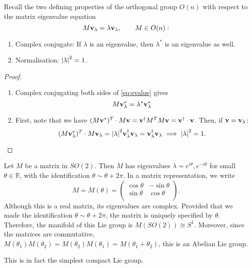 
Recall the two defining properties of the orthogonal group $O(n)$ with respect to the matrix eigenvalue equation
\begin{equation} \label{eq:evalue}
  M \vb{v}_\lambda = \lambda \vb{v}_\lambda, \qquad M \in O(n):
\end{equation}
\begin{enumerate}
  \item Complex conjugate: If $\lambda$ is an eigenvalue, then $\lambda^*$ is an eigenvalue as well.
  \item Normalisation: $\abs{\lambda}^2 = 1$.
\end{enumerate}
\begin{proof}
  \begin{enumerate}
    \item Complex conjugating both sides of \eqref{eq:evalue} gives
      \begin{equation}
        M \vb{v}_\lambda^* = \lambda^* \vb{v}_\lambda^*
      \end{equation}
    \item First, note that we have \((M \vb{v}^*)^T \cdot M \vb{v} = \vb{v}^{\dagger} M^T M \vb{v} = \vb{v}^{\dagger} \cdot \vb{v}\).
      Then, if $\vb{v} = \vb{v}_\lambda$:
      \begin{equation}
	(M \vb{v}_\lambda^*)^T \cdot M \vb{v}_\lambda = \abs{\lambda}^2 \vb{v}^{\dagger}_\lambda \vb{v}_\lambda = \vb{v}^{\dagger}_\lambda \vb{v}_\lambda \implies \abs{\lambda}^2 = 1.
      \end{equation}
  \end{enumerate}
\end{proof}

\begin{example}[G = SO(2)]
  Let $M$ be a matrix in $SO(2)$. Then $M$ has eigenvalues $\lambda = e^{i\theta}, e^{-i\theta}$ for small $\theta \in \mathbb{R}$, with the identification $\theta \sim \theta + 2\pi$.
  In a matrix representation, we write
  \begin{equation}
    M = M(\theta) = 
    \begin{pmatrix}
     \cos\theta & -\sin\theta \\
     \sin\theta & \cos\theta \\
    \end{pmatrix}.
  \end{equation}
  Although this is a real matrix, its eigenvalues are complex. Provided that we made the identification $\theta \sim \theta + 2\pi$, the matrix is uniquely specified by $\theta$.
  Therefore, the manifold of this Lie group is $M(SO(2)) \cong S^1$.
  Moreover, since the matrices are commutative, $M(\theta_1) M(\theta_2) = M(\theta_2) M(\theta_1) = M(\theta_1 + \theta_2)$, this is an Abelian Lie group.
\begin{leftbar}
  \begin{remark}
    This is in fact the simplest compact Lie group.
  \end{remark}
\end{leftbar}
\end{example}

